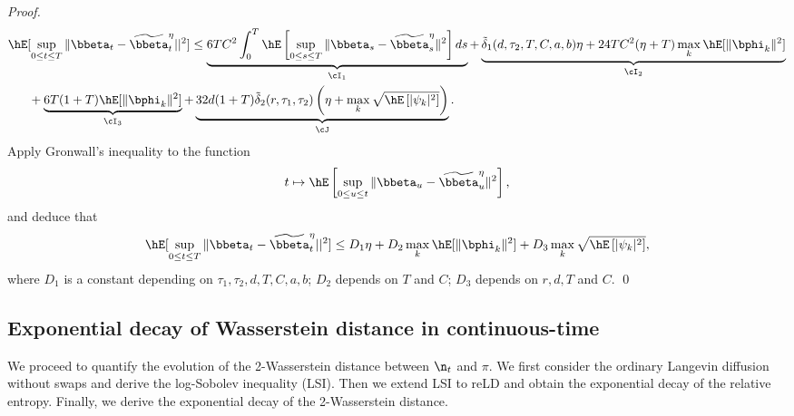 \begin{proof}
\begin{equation}
	\begin{split}
	&\hE[\sup_{0\le t\le T}\|\bbeta_t-\widetilde \bbeta^{\eta}_t||^2] \le \underbrace{6TC^2\int_0^T\hE\left[\sup_{0\le s\le T}\|\bbeta_s-\widetilde \bbeta^{\eta}_s\|^2\right]ds}_{\cI_1}+\underbrace{\tilde \delta_1(d, \tau_2, T, C, a, b) \eta+ 24TC^2(\eta+T)\max_{k}\hE[\|\bphi_k\|^2]}_{\cI_2}\\
	&\ \ \ \ \ +\underbrace{6T (1+T) \hE[\|\bphi_{k}\|^2]}_{\cI_3}+\underbrace{32d(1+T)\tilde \delta_2(r, \tau_1,\tau_2)\left(\eta+\max_{k}\sqrt{\hE\left[|\psi_{k}|^2\right]}\right)}_{\cJ}. 
	\end{split}
\end{equation}
Apply Gronwall's inequality to the function
\begin{equation*}
    t\mapsto \hE\left[\sup_{0\le u\le t} \|\bbeta_u-\widetilde \bbeta_u^{\eta}\|^2 \right],
\end{equation*}{}
and deduce that 
\begin{equation}
	\begin{split}
&	\hE[\sup_{0\le t\le T}\|\bbeta_t-\widetilde \bbeta^{\eta}_t||^2] \le D_1 \eta + D_2 \max_{k}\hE[\|\bphi_k\|^2]+D_3\max_{k}\sqrt{\hE\left[|\psi_{k}|^2\right]},\\
	\end{split}
\end{equation}
where $ D_1$ is a constant depending on $\tau_1,\tau_2,d, T, C,a,b$; $D_2$ depends on $T$ and $C$; $D_3$ depends on $r, d, T$ and $C$. \qed 


\end{proof}


\subsection{Exponential decay of Wasserstein distance in continuous-time}


We proceed to quantify the evolution of the 2-Wasserstein distance between $\n_{t}$ and $\pi$. We first consider the ordinary Langevin diffusion without swaps and derive the log-Sobolev inequality (LSI). Then we extend LSI to reLD and obtain the exponential decay of the relative entropy. Finally, we derive the exponential decay of the 2-Wasserstein distance.


